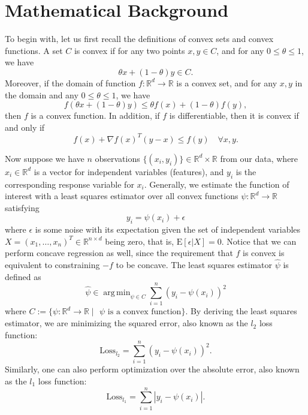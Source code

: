 \documentclass{article}
\newcommand{\E}{\mathrm{E}}
\DeclareMathOperator*{\argmin}{arg\,min}
\begin{document}
\section{Mathematical Background} \label{s2}
To begin with, let us first recall the definitions of convex sets and convex functions. A set $C$ is convex if for any two points $x,y \in C$, and for any $0 \leq \theta \leq 1$, we have
\begin{equation}
    \theta x + (1-\theta) y \in C.
\end{equation}
Moreover, if the domain of function $f: \mathbb{R}^d \rightarrow \mathbb{R}$ is a convex set, and for any $x,y$ in the domain and any $0 \leq \theta \leq 1$, we have
\begin{equation} \label{conv1}
    f(\theta x + (1-\theta) y) \leq \theta f(x) + (1-\theta) f(y),
\end{equation}
then $f$ is a convex function. In addition, if $f$ is differentiable, then it is convex if and only if
\begin{equation}
    f(x)+\nabla f(x)^T (y-x) \leq f(y) \quad \forall x,y.
\end{equation}

Now suppose we have $n$ observations $\{(x_i,y_i)\} \in \mathbb{R}^d \times \mathbb{R}$ from our data, where $x_i \in \mathbb{R}^d$ is a vector for independent variables (features), and $y_i$ is the corresponding response variable for $x_i$. Generally, we estimate the function of interest with a least squares estimator over all convex functions $\psi: \mathbb{R}^d \rightarrow \mathbb{R}$ satisfying
\begin{equation} \label{lr1}
    y_i = \psi(x_i) + \epsilon
\end{equation}
where $\epsilon$ is some noise with its expectation given the set of independent variables $X=(x_1,\dots,x_n)^T \in \mathbb{R}^{n \times d}$ being zero, that is, $\E[\epsilon|X]=0$. Notice that we can perform concave regression as well, since the requirement that $f$ is convex is equivalent to constraining $-f$ to be concave.  The least squares estimator $\hat{\psi}$ is defined as
\begin{equation} \label{lr2}
    \hat{\psi} \in \argmin_{\psi \in C} \sum_{i=1}^n (y_i-\psi(x_i))^2
\end{equation}
where $C:=\{\psi:\mathbb{R}^d \rightarrow \mathbb{R} \;|\text{ $\psi$ is a convex function} \}$. By deriving the least squares estimator, we are minimizing the squared error, also known as the $l_2$ loss function:
\begin{equation} \label{loss}
    \text{Loss}_{l_2}=\sum_{i=1}^n (y_i-\psi(x_i))^2.
\end{equation}
Similarly, one can also perform optimization over the absolute error, also known as the $l_1$ loss function:
\begin{equation} \label{loss}
    \text{Loss}_{l_1}=\sum_{i=1}^n |y_i-\psi(x_i)|.
\end{equation}
\end{document}
